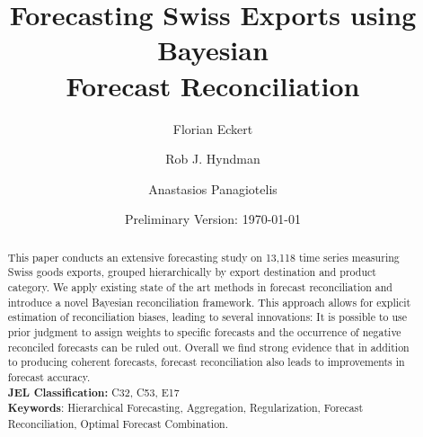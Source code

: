 


\title{\huge Forecasting Swiss Exports using Bayesian \\Forecast Reconciliation}

\author[$\dagger$]{Florian Eckert}
\author[$\ddagger$]{Rob J. Hyndman}
\author[$\ddagger$]{Anastasios Panagiotelis}
\date{Preliminary Version: \today}

\maketitle
\begin{abstract}
\noindent This paper conducts an extensive forecasting study on 13,118 time series measuring Swiss goods exports, grouped hierarchically by export destination and product category.  We apply existing state of the art methods in forecast reconciliation and introduce a novel Bayesian reconciliation framework. This approach allows for explicit estimation of reconciliation biases, leading to several innovations: It is possible to use prior judgment to assign weights to specific forecasts and the occurrence of negative reconciled forecasts can be ruled out. Overall we find strong evidence that in addition to producing coherent forecasts, forecast reconciliation also leads to improvements in forecast accuracy.\\

\noindent \textbf{JEL Classification:} C32, C53, E17\\
\noindent \textbf{Keywords}: Hierarchical Forecasting, Aggregation, Regularization, Forecast Reconciliation, Optimal Forecast Combination.
\end{abstract}
\clearpage









